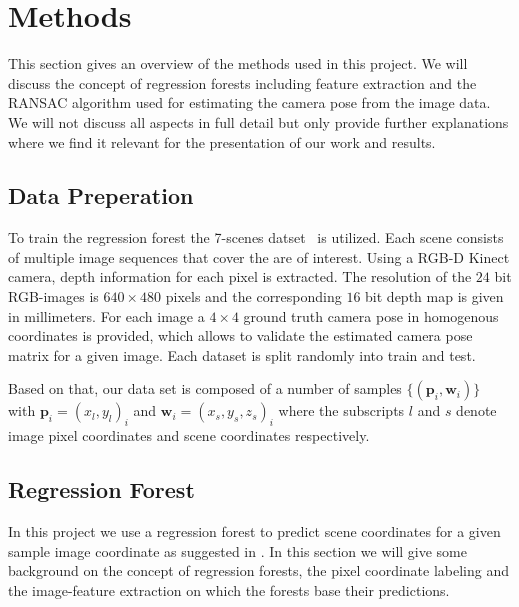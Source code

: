 \documentclass[final]{cvpr}
\begin{document}
\section{Methods}
This section gives an overview of the methods used in this project. We will discuss
the concept of regression forests including feature extraction and the RANSAC algorithm
used for estimating the camera pose from the image data. We will not discuss all aspects
in full detail but only provide further explanations where we find it relevant
for the presentation of our work and results.

\subsection{Data Preperation}
To train the regression forest the 7-scenes datset~\cite{glocker2013} is utilized. 
Each scene consists of multiple image sequences that cover the are of interest. Using a RGB-D 
Kinect camera, depth information for each pixel is extracted. The resolution of the $24$ 
bit RGB-images is $640\times480$ pixels and the corresponding $16$ bit depth map is given 
in millimeters. For each image a $4\times4$ ground truth camera pose in homogenous coordinates 
is provided, which allows to validate the estimated camera pose matrix for a given image. 
Each dataset is split randomly into train and test. 

Based on that, our data set is composed of a number of samples $\{(\boldsymbol{p}_i, \boldsymbol{w}_i)\}$ with
$\boldsymbol{p}_i = (x_l, y_l)_i$ and $\boldsymbol{w}_i = (x_s, y_s, z_s)_i$ where the subscripts
$l$ and $s$ denote image pixel coordinates and scene coordinates respectively.\\

\subsection{Regression Forest}

In this project we use a regression forest to predict scene coordinates for a given
sample image coordinate as suggested in \cite{shotton2013}. In this section we will
give some background on the concept of regression forests, the pixel coordinate
labeling and the image-feature extraction on which the forests base their predictions.\\
\end{document}
